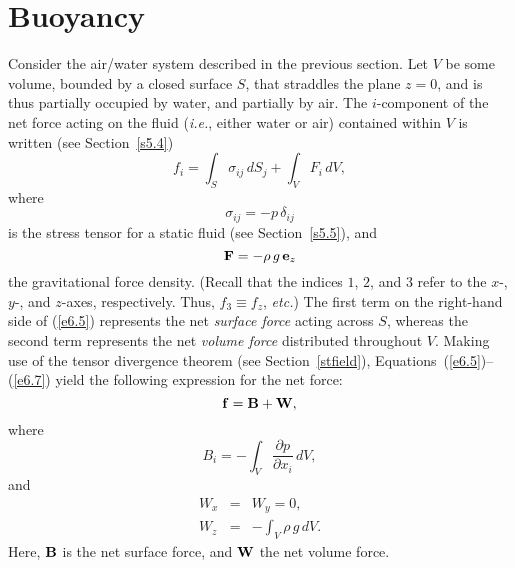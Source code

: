 \section{Buoyancy}\label{sbouy}
Consider the air/water system described in the previous section.
Let $V$ be some volume, bounded by a closed surface $S$, that straddles the plane $z=0$, and is thus partially occupied by water, and partially
by air. The $i$-component of the net force acting on the fluid ({\em i.e.}, either water or air) contained within $V$ is written (see Section~\ref{s5.4})
\begin{equation}\label{e6.5}
f_i = \int_S \sigma_{ij}\,dS_j + \int_V F_i\,dV,
\end{equation}
where
\begin{equation}
\sigma_{ij} = - p\,\delta_{ij}
\end{equation}
is the stress tensor for a static fluid (see Section~\ref{s5.5}), and
\begin{equation}\label{e6.7}
{\bf F} =- \rho\,g\,{\bf e}_z
\end{equation}
the gravitational force density. (Recall that the indices $1$, $2$, and $3$ refer to the $x$-, $y$-, and $z$-axes, respectively. Thus,
$f_3\equiv f_z$, {\em etc.})
The first term on the right-hand side of (\ref{e6.5}) represents the net {\em surface force}\/ acting across
 $S$, whereas the second term represents the net {\em volume force}\/ distributed throughout $V$. 
 Making use of the tensor divergence theorem (see Section~\ref{stfield}), Equations~(\ref{e6.5})--(\ref{e6.7})
yield the following expression for  the net force:
\begin{equation}
{\bf f}= {\bf B} + {\bf W},
\end{equation}
where 
\begin{equation}\label{e6.9}
B_i =- \int_V\frac{\partial p}{\partial x_i}\,dV,
\end{equation}
and
\begin{eqnarray}\label{e6.10}
W_x&=& W_y = 0,\\[0.5ex]
W_z &=&-\int_V \rho\,g\,dV.\label{e6.10b}
\end{eqnarray}
Here, ${\bf B}$ is the  net surface force, and ${\bf W}$   the net volume force. 

